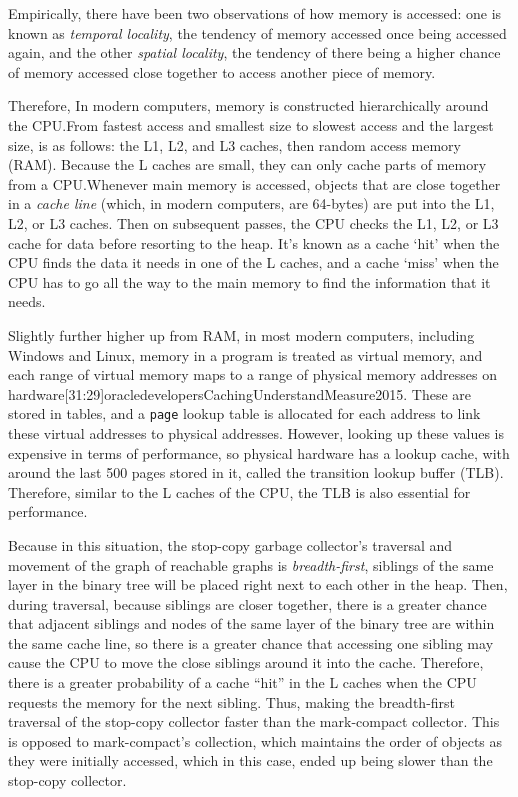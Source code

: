 \documentclass[index]{subfiles}
\begin{document}
Empirically, there have been two observations of how memory is accessed: one is known as \textit{temporal locality}, the tendency of memory accessed once being accessed again, and the other \textit{spatial locality}, the tendency of there being a higher chance of memory accessed close together to access another piece of memory\cite[18:21]{oracledevelopersCachingUnderstandMeasure2015}.

Therefore, In modern computers, memory is constructed hierarchically\cite{simondevCanJavaScriptGo2021} around the CPU.\@ From fastest access and smallest size to slowest access and the largest size, is as follows: the L1, L2, and L3 caches, then random access memory (RAM)\cite{simondevCanJavaScriptGo2021}. Because the L caches are small, they can only cache parts of memory from a CPU.\@ Whenever main memory is accessed, objects that are close together in a \textit{cache line} (which, in modern computers, are 64-bytes) are put into the L1, L2, or L3 caches\cites{simondevCanJavaScriptGo2021}{code_project}. Then on subsequent passes, the CPU checks the L1, L2, or L3 cache for data before resorting to the heap. It's known as a cache `hit' when the CPU finds the data it needs in one of the L caches, and a cache `miss'\cite{simondevCanJavaScriptGo2021} when the CPU has to go all the way to the main memory to find the information that it needs.

Slightly further higher up from RAM, in most modern computers, including Windows and Linux, memory in a program is treated as virtual memory, and each range of virtual memory maps to a range of physical memory addresses on hardware\cite{code_project}[31:29]{oracledevelopersCachingUnderstandMeasure2015}. These are stored in tables, and a \verb+page+ lookup table is allocated for each address to link these virtual addresses to physical addresses. However, looking up these values is expensive in terms of performance, so physical hardware has a lookup cache, with around the last 500 pages stored in it, called the transition lookup buffer (TLB)\cites{code_project}[32:42]{oracledevelopersCachingUnderstandMeasure2015}. Therefore, similar to the L caches of the CPU, the TLB is also essential for performance.

Because in this situation, the stop-copy garbage collector's traversal and movement of the graph of reachable graphs is \textit{breadth-first}, siblings of the same layer in the binary tree will be placed right next to each other in the heap. Then, during traversal, because siblings are closer together, there is a greater chance that adjacent siblings and nodes of the same layer of the binary tree are within the same cache line, so there is a greater chance that accessing one sibling may cause the CPU to move the close siblings around it into the cache. Therefore, there is a greater probability of a cache ``hit'' in the L caches when the CPU requests the memory for the next sibling. Thus, making the breadth-first traversal of the stop-copy collector faster than the mark-compact collector. This is opposed to mark-compact's collection, which maintains the order of objects as they were initially accessed, which in this case, ended up being slower than the stop-copy collector.
\end{document}
